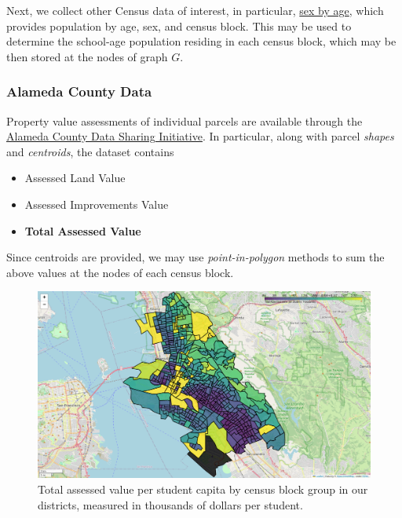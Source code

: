 \documentclass{article}
\begin{document}
Next, we collect other Census data of interest, in particular, \href{https://data.census.gov/table?q=P12&t=Age%20and%20Sex&g=050XX00US06001$1000000&y=2020&d=DEC%20Demographic%20and%20Housing%20Characteristics}{sex by age}, which provides population by age, sex, and census block. This may be used to determine the school-age population residing in each census block, which may be then stored at the nodes of graph \(G\).

\subsubsection*{Alameda County Data}


Property value assessments of individual parcels are available through the \href{https://data.acgov.org/datasets/2b026350b5dd40b18ed7a321fdcdba81_0/explore?location=37.716012%2C-122.135377%2C19.19}{Alameda County Data Sharing Initiative}. In particular, along with parcel \textit{shapes} and \textit{centroids}, the dataset contains 
\begin{itemize}
    \item Assessed Land Value
    \item Assessed Improvements Value
    \item \textbf{Total Assessed Value}
\end{itemize}
Since centroids are provided, we may use \textit{point-in-polygon} methods to sum the above values at the nodes of each census block.%

\begin{figure}[H]
    \centering
    \includegraphics[width=\textwidth]{figure/districts_value.png}
    \caption{Total assessed value per student capita by census block group in our districts, measured in thousands of dollars per student.}
    \label{fig:land-value}
\end{figure}
\end{document}
